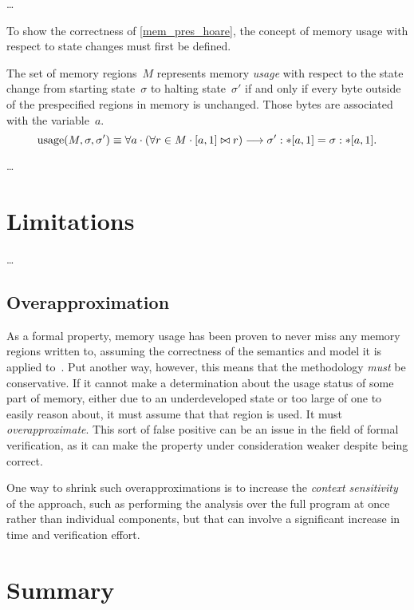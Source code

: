 \todo\dots

To show the correctness of \cref{mem_pres_hoare},
the concept of memory usage with respect to state changes must first be defined.
\begin{definition}
  The set of memory regions~$M$ represents memory \emph{usage} with respect to
  the state change from starting state~$\sigma$ to halting state~$\sigma'$
  if and only if every byte outside of the prespecified regions in memory is unchanged.
  Those bytes are associated with the variable~$a$.
  \begin{equation}
    \operatorname{usage}(M,\sigma,\sigma')\equiv\forall a\cdot(\forall r\in M\cdot[a,1]\bowtie r)
    \longrightarrow\sigma':\ast[a,1]=\sigma:\ast[a,1].
  \end{equation}
\end{definition}
\begin{example}
\end{example}

\todo\dots

\section{Limitations}\label{mem_use_limits}
\todo\dots

\subsection{Overapproximation}\label{mem_use_over}
As a formal property, memory usage has been proven to never miss any memory regions
written to, assuming the correctness of the semantics and model it is applied
to~\citep{bockenek2019preservation,popl2019underreview}.
Put another way, however, this means that the methodology \emph{must} be conservative.
If it cannot make a determination about the usage status of some part of memory,
either due to an underdeveloped state or too large of one to easily reason about,
it must assume that that region is used. It must \emph{overapproximate}.%
This sort of false positive can be an issue in the field of formal verification,
as it can make the property under consideration weaker despite being correct.

One way to shrink such overapproximations is to increase the
\emph{context sensitivity}
of the approach, such as performing the analysis over the full program at once
rather than individual components, but that can involve
a significant increase in time and verification effort.


\section{Summary}
